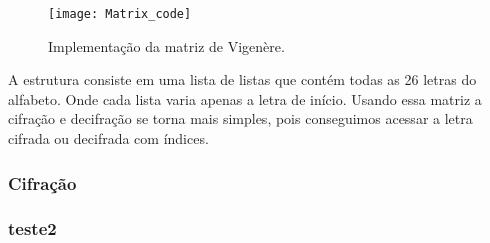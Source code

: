 \documentclass{article}
\begin{document}
\begin{figure}[h]
    \texttt{[image: Matrix\_code]}
    \centering
    \caption{Implementação da matriz de Vigenère.}
    \label{fig:matriz_code}
  \end{figure}

A estrutura consiste em uma lista de listas que contém todas as 26 letras do alfabeto. Onde cada lista varia apenas a letra de início.
Usando essa matriz a cifração e decifração se torna mais simples, pois conseguimos acessar a letra cifrada ou decifrada com índices.

\subsubsection{Cifração}
\subsubsection{teste2}
\end{document}
